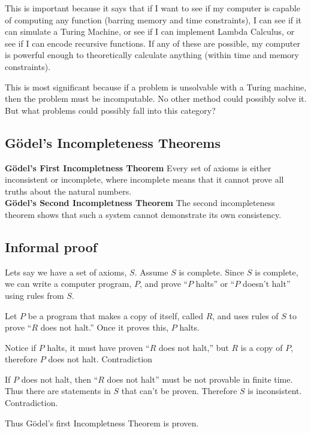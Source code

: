 \documentclass[11pt, letterpaper, twoside, openright]{book}
\begin{document}
This is important because it says that if I want to see if my computer is capable of computing any function (barring memory and time constraints), I can see if it can simulate a Turing Machine, or see if I can implement Lambda Calculus, or see if I can encode recursive functions. If any of these are possible, my computer is powerful enough to theoretically calculate anything (within time and memory constraints).

This is most significant because if a problem is unsolvable with a Turing machine, then the problem must be incomputable. No other method could possibly solve it. But what problems could possibly fall into this category?

\subsection{G\"odel's Incompleteness Theorems}
\textbf{G\"odel's First Incompletness Theorem} Every set of axioms is either inconsistent or incomplete, where incomplete means that it cannot prove all truths about the natural numbers.\\\textbf{G\"odel's Second Incompletness Theorem} The second incompleteness theorem shows that such a system cannot demonstrate its own consistency.

\subsection{Informal proof}
Lets say we have a set of axioms, $S$. Assume $S$ is complete. Since $S$ is complete, we can write a computer program, $P$, and prove ``$P$ halts'' or ``$P$ doesn't halt'' using rules from $S$.

Let $P$ be a program that makes a copy of itself, called $R$, and uses rules of $S$ to prove ``$R$ does not halt.'' Once it proves this, $P$ halts.

Notice if $P$ halts, it must have proven ``$R$ does not halt,'' but $R$ is a copy of $P$, therefore $P$ does not halt. Contradiction

If $P$ does not halt, then ``$R$ does not halt'' must be not provable in finite time. Thus there are statements in $S$ that can't be proven. Therefore $S$ is inconsistent. Contradiction.

Thus G\"odel's first Incompletness Theorem is proven. %

\end{document}
